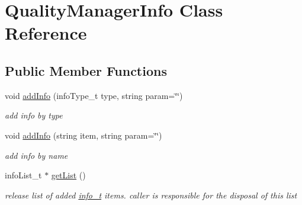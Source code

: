 \hypertarget{classQualityManagerInfo}{}\section{Quality\+Manager\+Info Class Reference}
\label{classQualityManagerInfo}
\subsection*{Public Member Functions}
\begin{DoxyCompactItemize}
\item 
\mbox{\label{classQualityManagerInfo_a68541c99dbb1b12f64a3c3332942abcc}} 
void \hyperlink{classQualityManagerInfo_a68541c99dbb1b12f64a3c3332942abcc}{add\+Info} (info\+Type\+\_\+t type, string param=\char`\"{}\char`\"{})
\begin{DoxyCompactList}\small\item\em add info by type \end{DoxyCompactList}\item 
\mbox{\label{classQualityManagerInfo_a8850cde36eff31f41e04d3921aa9cb9e}} 
void \hyperlink{classQualityManagerInfo_a8850cde36eff31f41e04d3921aa9cb9e}{add\+Info} (string item, string param=\char`\"{}\char`\"{})
\begin{DoxyCompactList}\small\item\em add info by name \end{DoxyCompactList}\item 
\mbox{\label{classQualityManagerInfo_aff1d373f19ec9ea5993d857c2a52309f}} 
info\+List\+\_\+t $\ast$ \hyperlink{classQualityManagerInfo_aff1d373f19ec9ea5993d857c2a52309f}{get\+List} ()
\begin{DoxyCompactList}\small\item\em release list of added \hyperlink{structinfo__t}{info\+\_\+t} items. caller is responsible for the disposal of this list \end{DoxyCompactList}\end{DoxyCompactItemize}

